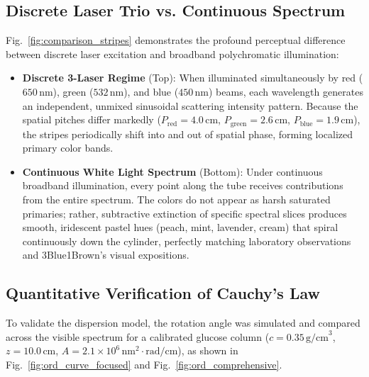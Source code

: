 \documentclass[twocolumn,10pt,a4paper]{article}
\begin{document}
\subsection{Discrete Laser Trio vs. Continuous Spectrum}
Fig.~\ref{fig:comparison_stripes} demonstrates the profound perceptual difference between discrete laser excitation and broadband polychromatic illumination:
\begin{itemize}[leftmargin=*]
  \item \textbf{Discrete 3-Laser Regime} (Top): When illuminated simultaneously by red ($650\,\text{nm}$), green ($532\,\text{nm}$), and blue ($450\,\text{nm}$) beams, each wavelength generates an independent, unmixed sinusoidal scattering intensity pattern. Because the spatial pitches differ markedly ($P_{\text{red}} = 4.0\,\text{cm}$, $P_{\text{green}} = 2.6\,\text{cm}$, $P_{\text{blue}} = 1.9\,\text{cm}$), the stripes periodically shift into and out of spatial phase, forming localized primary color bands.
  \item \textbf{Continuous White Light Spectrum} (Bottom): Under continuous broadband illumination, every point along the tube receives contributions from the entire spectrum. The colors do not appear as harsh saturated primaries; rather, subtractive extinction of specific spectral slices produces smooth, iridescent pastel hues (peach, mint, lavender, cream) that spiral continuously down the cylinder, perfectly matching laboratory observations and 3Blue1Brown's visual expositions.
\end{itemize}

\subsection{Quantitative Verification of Cauchy's Law}
To validate the dispersion model, the rotation angle was simulated and compared across the visible spectrum for a calibrated glucose column ($c = 0.35\,\text{g/cm}^3$, $z = 10.0\,\text{cm}$, $A = 2.1 \times 10^6\,\text{nm}^2\cdot\text{rad/cm}$), as shown in Fig.~\ref{fig:ord_curve_focused} and Fig.~\ref{fig:ord_comprehensive}.
\end{document}
